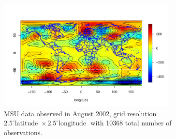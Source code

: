 
\begin{figure}[H]
\label{MSU_data}
\centering
\includegraphics [width=0.8\textwidth, keepaspectratio]{graphs/MSU_data.pdf}
\caption[MSU Data Observed in August 2002, Grid Resolution $2.5^\circ\mbox{latitude }$]{MSU data observed in August 2002, grid resolution $2.5^\circ \mbox{latitude } \times 2.5^\circ \mbox{longitude }$ with 10368 total number of observations.}
\end{figure}

\vfill


